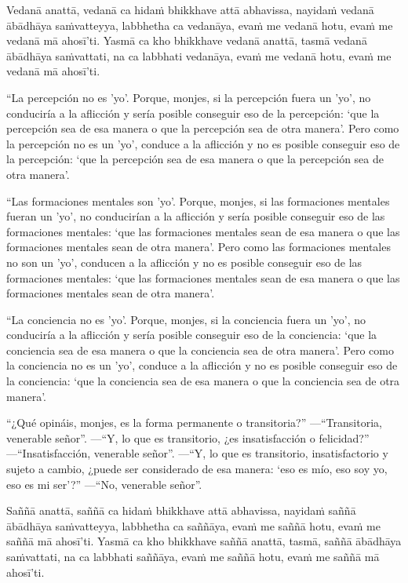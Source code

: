 Vedanā anattā, vedanā ca hidaṁ bhikkhave attā abhavissa, nayidaṁ vedanā ābādhāya
saṁvatteyya, labbhetha ca vedanāya, evaṁ me vedanā hotu, evaṁ me vedanā mā
ahosī'ti. Yasmā ca kho bhikkhave vedanā anattā, tasmā vedanā ābādhāya
saṁvattati, na ca labbhati vedanāya, evaṁ me vedanā hotu, evaṁ me vedanā mā
ahosī'ti.

\clearpage

\englishText
\markboth{\englishTitle}{\rightmark}

“La percepción no es 'yo'. Porque, monjes, si la percepción fuera un 'yo', no conduciría a la aflicción y sería posible conseguir eso de la percepción: ‘que la percepción sea de esa manera o que la percepción sea de otra manera’. Pero como la percepción no es un 'yo', conduce a la aflicción y no es posible conseguir eso de la percepción: ‘que la percepción sea de esa manera o que la percepción sea de otra manera’.

“Las formaciones mentales son 'yo'. Porque, monjes, si las formaciones mentales fueran un 'yo', no conducirían a la aflicción y sería posible conseguir eso de las formaciones mentales: ‘que las formaciones mentales sean de esa manera o que las formaciones mentales sean de otra manera’. Pero como las formaciones mentales no son un 'yo', conducen a la aflicción y no es posible conseguir eso de las formaciones mentales: ‘que las formaciones mentales sean de esa manera o que las formaciones mentales sean de otra manera’.

“La conciencia no es 'yo'. Porque, monjes, si la conciencia fuera un 'yo', no conduciría a la aflicción y sería posible conseguir eso de la conciencia: ‘que la conciencia sea de esa manera o que la conciencia sea de otra manera’. Pero como la conciencia no es un 'yo', conduce a la aflicción y no es posible conseguir eso de la conciencia: ‘que la conciencia sea de esa manera o que la conciencia sea de otra manera’.

“¿Qué opináis, monjes, es la forma permanente o transitoria?”
—“Transitoria, venerable señor”.
—“Y, lo que es transitorio, ¿es insatisfacción o felicidad?”
—“Insatisfacción, venerable señor”.
—“Y, lo que es transitorio, insatisfactorio y sujeto a cambio, ¿puede ser considerado de esa manera: ‘eso es mío, eso soy yo, eso es mi ser’?”
—“No, venerable señor”.



\clearpage

\paliText
\markboth{\paliTitle}{\rightmark}

Saññā anattā, saññā ca hidaṁ bhikkhave attā abhavissa, nayidaṁ saññā ābādhāya
saṁvatteyya, labbhetha ca saññāya, evaṁ me saññā hotu, evaṁ me saññā mā
ahosī'ti. Yasmā ca kho bhikkhave saññā anattā, tasmā, saññā ābādhāya saṁvattati,
na ca labbhati saññāya, evaṁ me saññā hotu, evaṁ me saññā mā ahosī'ti.

